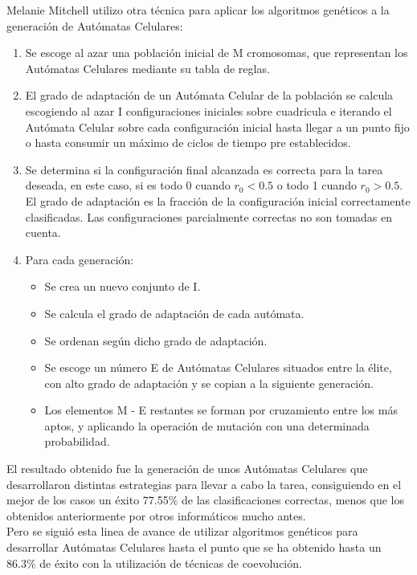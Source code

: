 Melanie Mitchell \cite{melanie} utilizo otra técnica para aplicar los algoritmos genéticos a la generación de Autómatas Celulares:
\begin{enumerate}
\item  Se escoge al azar una población inicial de M cromosomas, que representan los Autómatas Celulares mediante su tabla de reglas.
\item El grado de adaptación de un Autómata Celular de la población se calcula escogiendo al azar I configuraciones iniciales sobre cuadricula e iterando el Autómata Celular sobre cada configuración inicial hasta llegar a un punto fijo o hasta consumir un máximo de ciclos de tiempo pre establecidos.
\item Se determina si la configuración final alcanzada es correcta para la tarea deseada, en este caso, si es todo 0 cuando $r_0 < 0.5$ o todo 1 cuando $r_0 > 0.5$. El grado de adaptación es la fracción de la configuración inicial correctamente clasificadas. Las configuraciones parcialmente correctas no son tomadas en cuenta.
\item Para cada generación: 
\begin{itemize}
\item Se crea un nuevo conjunto de I.
\item Se calcula el grado de adaptación de cada autómata.
\item Se ordenan según dicho grado de adaptación.
\item Se escoge un número E de Autómatas Celulares situados entre la élite, con alto grado de adaptación y se copian a la siguiente generación.
\item Los elementos M - E restantes se forman por cruzamiento entre los más aptos, y aplicando la operación de mutación con una determinada probabilidad.
\end{itemize}
\end{enumerate}

El resultado obtenido fue la generación de unos Autómatas Celulares que desarrollaron distintas estrategias para llevar a cabo la tarea, consiguiendo en el mejor de los casos un éxito 77.55\% de las clasificaciones correctas, menos que los obtenidos anteriormente por otros informáticos mucho antes.\\

Pero se siguió esta linea de avance de utilizar algoritmos genéticos para desarrollar Autómatas Celulares hasta el punto que se ha obtenido hasta un 86.3\% de éxito con la utilización de técnicas de coevolución.\\

